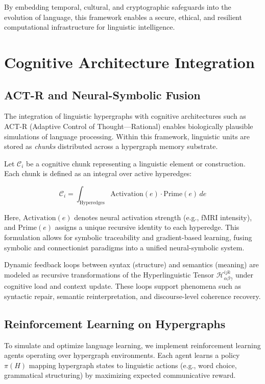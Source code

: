 \documentclass{article}
\theoremstyle{plain}
\theoremstyle{claimstyle}
\begin{document}
By embedding temporal, cultural, and cryptographic safeguards into the evolution of language, this framework enables a secure, ethical, and resilient computational infrastructure for linguistic intelligence.
\section{Cognitive Architecture Integration}

\subsection{ACT-R and Neural-Symbolic Fusion}

The integration of linguistic hypergraphs with cognitive architectures such as ACT-R (Adaptive Control of Thought—Rational) enables biologically plausible simulations of language processing. Within this framework, linguistic units are stored as \textit{chunks} distributed across a hypergraph memory substrate.

Let $\mathcal{C}_i$ be a cognitive chunk representing a linguistic element or construction. Each chunk is defined as an integral over active hyperedges:

\[
\mathcal{C}_i = \int_{\text{Hyperedges}} \text{Activation}(e) \cdot \text{Prime}(e) \, de
\]

Here, $\text{Activation}(e)$ denotes neural activation strength (e.g., fMRI intensity), and $\text{Prime}(e)$ assigns a unique recursive identity to each hyperedge. This formulation allows for symbolic traceability and gradient-based learning, fusing symbolic and connectionist paradigms into a unified neural-symbolic system.

Dynamic feedback loops between syntax (structure) and semantics (meaning) are modeled as recursive transformations of the Hyperlinguistic Tensor $\mathcal{H}_{\alpha\beta\gamma}^{ijk}$ under cognitive load and context update. These loops support phenomena such as syntactic repair, semantic reinterpretation, and discourse-level coherence recovery.

\subsection{Reinforcement Learning on Hypergraphs}

To simulate and optimize language learning, we implement reinforcement learning agents operating over hypergraph environments. Each agent learns a policy $\pi(H)$ mapping hypergraph states to linguistic actions (e.g., word choice, grammatical structuring) by maximizing expected communicative reward.
\end{document}
